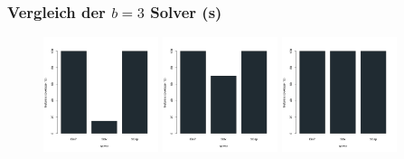 \documentclass{beamer}
\begin{document}
\begin{frame}
\frametitle{Vergleich der $b = 3$ Solver (s)}

\begin{figure}
\centering
\includegraphics[width=0.3\textwidth]{images/solver_instance_coverage_b=3_s_3s.png}
\includegraphics[width=0.3\textwidth]{images/solver_instance_coverage_b=3_s_5s.png}
\includegraphics[width=0.3\textwidth]{images/solver_instance_coverage_b=3_s_10s.png}
\caption*{\textsc{Zeitlimit} $3s$ $\quad\quad\quad\quad$ \textsc{Zeitlimit} $5s$ $\quad\quad\quad\quad$ \textsc{Zeitlimit} $10s$}
\begin{subfigure}[b]{0.3\textwidth}
\centering
{}
\end{subfigure}
\end{figure}
\end{frame}
\end{document}
